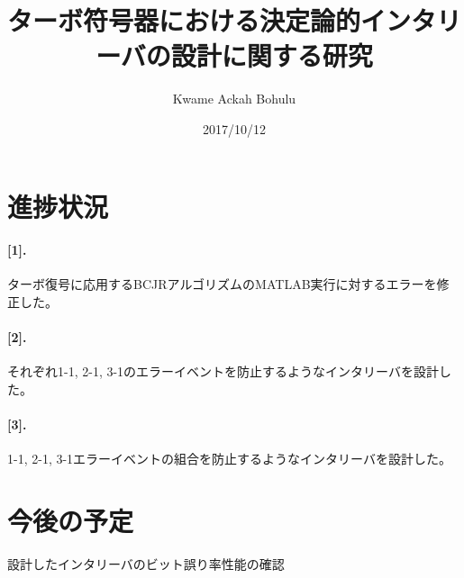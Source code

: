 \documentclass[20 pts]{article}
\title{ターボ符号器における決定論的インタリーバの設計に関する研究}
\author{Kwame Ackah Bohulu}
\date{2017/10/12}
\begin{document}
\maketitle

\newpage
\section{進捗状況}

\paragraph{[1].}
ターボ復号に応用するBCJRアルゴリズムのMATLAB実行に対するエラーを修正した。

\paragraph{[2].}

それぞれ1-1, 2-1, 3-1のエラーイベントを防止するようなインタリーバを設計した。
\paragraph{[3].}

1-1, 2-1, 3-1エラーイベントの組合を防止するようなインタリーバを設計した。
\section{今後の予定}
設計したインタリーバのビット誤り率性能の確認
\end{document}
